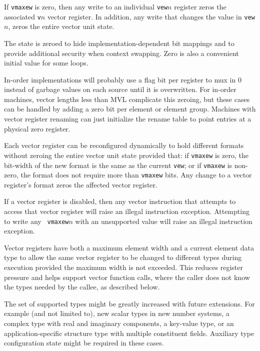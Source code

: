If {\tt vmaxew} is zero, then any write to an individual {\tt vew}$n$
register zeros the associated {\tt v}$n$ vector register.  In addition,
any write that changes the value in {\tt vew}$n$, zeros the entire vector
unit state.

\begin{commentary}
  The state is zeroed to hide implementation-dependent bit mappings
  and to provide additional security when context swapping.  Zero is
  also a convenient initial value for some loops.

  In-order implementations will probably use a flag bit per register to
  mux in 0 instead of garbage values on each source until it is
  overwritten.  For in-order machines, vector lengths less than MVL
  complicate this zeroing, but these cases can be handled by adding a
  zero bit per element or element group.  Machines with vector
  register renaming can just initialize the rename table to point
  entries at a physical zero register.
\end{commentary}

Each vector register can be reconfigured dynamically to hold different
formats without zeroing the entire vector unit state provided that: if
{\tt vmaxew} is zero, the bit-width of the new format is the same as
the current {\tt vew}; or if {\tt vmaxew} is non-zero, the format does
not require more than {\tt vmaxew} bits.  Any change to a vector
register's format zeros the affected vector register.

If a vector register is disabled, then any vector instruction
that attempts to access that vector register will raise an
illegal instruction exception.  Attempting to write any {\tt
  vmaxew}$n$ with an unsupported value will raise an illegal
instruction exception.

\begin{commentary}
  Vector registers have both a maximum element width and a
  current element data type to allow the same vector register to
  be changed to different types during execution provided the
  maximum width is not exceeded.  This reduces register pressure and
  helps support vector function calls, where the caller does not know
  the types needed by the callee, as described below.
\end{commentary}

\begin{commentary}
  The set of supported types might be greatly increased with future
  extensions.  For example (and not limited to), new scalar types in
  new number systems, a complex type with real and imaginary
  components, a key-value type, or an application-specific structure
  type with multiple constituent fields.  Auxiliary type
  configuration state might be required in these cases.
\end{commentary}

